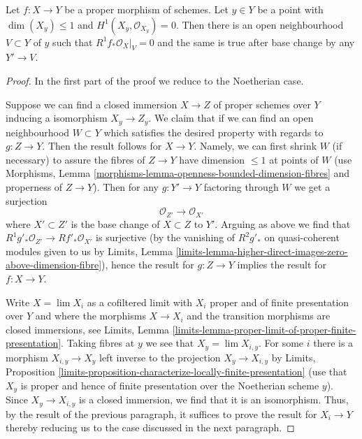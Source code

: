 \begin{lemma}
\label{lemma-h1-fibre-zero}
Let $f : X \to Y$ be a proper morphism of schemes. Let $y \in Y$
be a point with $\dim(X_y) \leq 1$ and $H^1(X_y, \mathcal{O}_{X_y}) = 0$.
Then there is an open neighbourhood $V \subset Y$ of $y$ such that
$R^1f_*\mathcal{O}_X|_V = 0$
and the same is true after base change by any $Y' \to V$.
\end{lemma}

\begin{proof}
In the first part of the proof we reduce to the Noetherian case.

\medskip\noindent
Suppose we can find a closed immersion $X \to Z$ of proper schemes over $Y$
inducing a isomorphism
$X_y \to Z_y$. We claim that if we can find an open neighbourhood
$W \subset Y$ which satisfies the desired property with regards to
$g : Z \to Y$. Then the result follows for $X \to Y$.
Namely, we can first shrink $W$ (if necessary) to assure
the fibres of $Z \to Y$ have dimension $\leq 1$ at points of $W$
(use Morphisms, Lemma \ref{morphisms-lemma-openness-bounded-dimension-fibres}
and properness of $Z \to Y$). Then for any $g : Y' \to Y$ factoring
through $W$ we get a surjection
$$
\mathcal{O}_{Z'} \longrightarrow \mathcal{O}_{X'}
$$
where $X' \subset Z'$ is the base change of $X \subset Z$ to $Y'$.
Arguing as above we find that
$R^1g'_*\mathcal{O}_{Z'} \to Rf'_*\mathcal{O}_{X'}$
is surjective (by the vanishing of $R^2g'_*$ on quasi-coherent modules
given to us by Limits, Lemma
\ref{limits-lemma-higher-direct-images-zero-above-dimension-fibre}),
hence the result for $g : Z \to Y$ implies the result for $f : X \to Y$.

\medskip\noindent
Write $X = \lim X_i$ as a cofiltered limit with $X_i$ proper and of finite
presentation over $Y$ and where the morphisms $X \to X_i$ and
the transition morphisms are closed immersions, see
Limits, Lemma \ref{limits-lemma-proper-limit-of-proper-finite-presentation}.
Taking fibres at $y$ we see that $X_y = \lim X_{i, y}$.
For some $i$ there is a morphism $X_{i, y} \to X_y$
left inverse to the projection $X_y \to X_{i, y}$ by
Limits, Proposition
\ref{limits-proposition-characterize-locally-finite-presentation}
(use that $X_y$ is proper and hence of finite presentation over
the Noetherian scheme $y$). Since $X_y \to X_{i, y}$ is a closed
immersion, we find that it is an isomorphism.
Thus, by the result of the previous paragraph, it suffices
to prove the result for $X_i \to Y$ thereby reducing us
to the case discussed in the next paragraph.


\end{proof}
